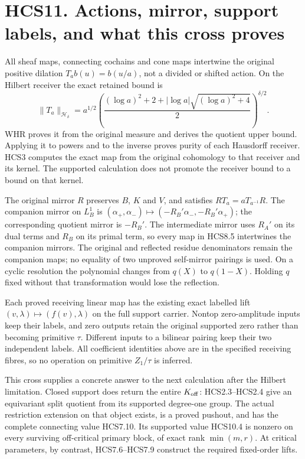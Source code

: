 \section{HCS11. Actions, mirror, support labels, and what this cross
proves}\label{hcs11.-actions-mirror-support-labels-and-what-this-cross-proves}

All sheaf maps, connecting cochains and cone maps intertwine the
original positive dilation \(T_ab(u)=b(u/a)\), not a divided or shifted
action. On the Hilbert receiver the exact retained bound is \[
\|T_a\|_{\mathcal H_\delta}
=a^{1/2}
\left(\frac{(\log a)^2+2+
|\log a|\sqrt{(\log a)^2+4}}2\right)^{\delta/2}.
\tag{HCS11.1}
\] WHR proves it from the original measure and derives the quotient
upper bound. Applying it to powers and to the inverse proves purity of
each Hausdorff receiver. HCS3 computes the exact map from the original
cohomology to that receiver and its kernel. The supported calculation
does not promote the receiver bound to a bound on that kernel.

The original mirror \(R\) preserves \(B\), \(K\) and \(V\), and
satisfies \(RT_a=aT_{a^{-1}}R\). The companion mirror on \(L_B^1\) is
\((\alpha_+,\alpha_-)\mapsto(-R_B'\alpha_-,-R_B'\alpha_+)\); the
corresponding quotient mirror is \(-R_B'\). The intermediate mirror uses
\(R_A'\) on its dual terms and \(R_B\) on its primal term, so every map
in HCS8.5 intertwines the companion mirrors. The original and reflected
residue denominators remain the companion maps; no equality of two
unproved self-mirror pairings is used. On a cyclic resolution the
polynomial changes from \(q(X)\) to \(q(1-X)\). Holding \(q\) fixed
without that transformation would lose the reflection.

Each proved receiving linear map has the existing exact labelled lift
\((v,\lambda)\mapsto(f(v),\lambda)\) on the full support carrier. Nontop
zero-amplitude inputs keep their labels, and zero outputs retain the
original supported zero rather than becoming primitive \(\tau\).
Different inputs to a bilinear pairing keep their two independent
labels. All coefficient identities above are in the specified receiving
fibres, so no operation on primitive \(Z_1/\tau\) is inferred.

This cross supplies a concrete answer to the next calculation after the
Hilbert limitation. Closed support does return the entire
\(K_{\rm off}\): HCS2.3--HCS2.4 give an equivariant split quotient from
its supported degree-one group. The actual restriction extension on that
object exists, is a proved pushout, and has the complete connecting
value HCS7.10. Its supported value HCS10.4 is nonzero on every surviving
off-critical primary block, of exact rank \(\min(m,r)\). At critical
parameters, by contrast, HCS7.6--HCS7.9 construct the required
fixed-order lifts.

